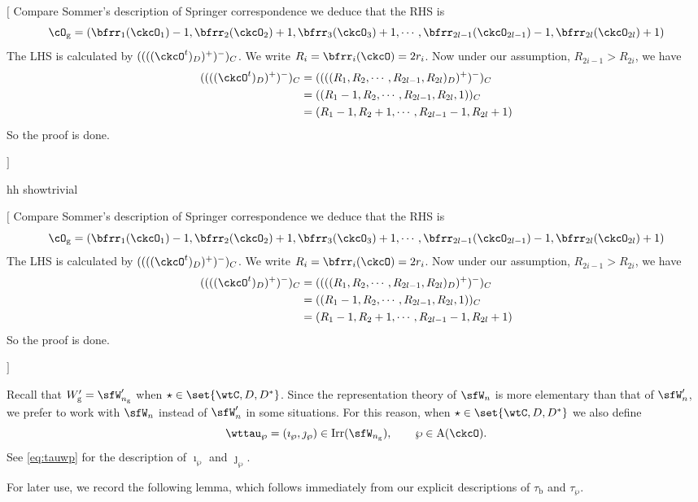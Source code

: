 \documentclass[12pt,a4paper]{amsart}
\newcommand{\trivial}[2][]{\if\relax\detokenize{#1}\relax
  {%
      \color{orange} \vspace{0em} $[$  #2 $]$
      \color{black}
  }
  \else
\ifx#1h
\ifcsname showtrivial\endcsname
{%
    \color{orange} \vspace{0em}  $[$ #2 $]$
    \color{black}
}
\fi
\else {\red Wrong argument!} \fi
\fi
}
\numberwithin{equation}{section}
\theoremstyle{remark}
\newtheorem{remark}[thm]{Remark}
\def\Irr{\mathrm{Irr}}
\def\dBV{d_{\mathrm{BV}}}
\def\Wg{W_{\mathrm g}}
\def\cuprow{{\stackrel{r}{\sqcup}}}
\def\cupcol{{\stackrel{c}{\sqcup}}}
\def\cuprow{{\,\stackrel{r}{\sqcup}\,}}
\def\cupcol{{\,\stackrel{c}{\sqcup}\,}}
\begin{document}
    \trivial[h]{ Compare Sommer's description of Springer correspondence we
      deduce that the RHS is
      \[
        \cO_{\mathrm g} = (\bfrr_{1}(\ckcO_{1})-1,\bfrr_{2}(\ckcO_{2})+1,\bfrr_{3}(\ckcO_{3})+1, \cdots, \bfrr_{2l-1}(\ckcO_{2l-1})-1,\bfrr_{2l}(\ckcO_{2l})+1)
      \]
      The LHS is calculated by $((((\ckcO^{t})_{D})^{+})^{-})_{C}$. We write
      $R_{i}=\bfrr_{i}(\ckcO)=2r_{i}$. Now under our assumption,
      $R_{2i-1}>R_{2i}$, we have
      \[
        \begin{split}
          ((((\ckcO^{t})_{D})^{+})^{-})_{C} &=
          ((((R_{1},R_{2}, \cdots, R_{2l-1},R_{2l})_{D})^{+})^{-})_{C}\\
          &=((R_{1}-1,R_{2}, \cdots, R_{2l-1},R_{2l},1))_{C}\\
          &=(R_{1}-1,R_{2}+1, \cdots, R_{2l-1}-1,R_{2l}+1)\\
        \end{split}
      \]
      So the proof is done.

    }



%

Recall that $\Wg' =\sfW'_{n_{\mathrm g}}$ when $\star \in \set{\wtC,D,D^{*}}$. Since the representation theory of $\sfW_{n}$ is more elementary than that of
$\sfW'_{n}$, we prefer to work with $\sfW_n$ instead of $\sfW_n'$ in some situations. For this reason, when $\star \in \set{\wtC,D,D^{*}}$ we also define
\begin{equation}\label{eq:ttauwp}
\wttau_{\wp} = (\imath_{\wp},\jmath_{\wp})\in \Irr(\sfW_{n_\mathrm g}), \qquad \wp\in {\mathrm A}(\ckcO).
\end{equation}
See \eqref{eq:tauwp} for the description of $\imath_{\wp}$ and $\jmath_{\wp}$.

For later use, we record the following lemma, which follows immediately from our explicit descriptions of  $\tau_{\mathrm b}$ and $\tau_{\wp}$.
\end{document}
